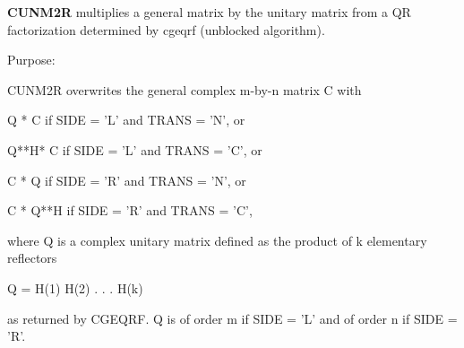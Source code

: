 {\bfseries C\+U\+N\+M2\+R} multiplies a general matrix by the unitary matrix from a Q\+R factorization determined by cgeqrf (unblocked algorithm). 

 \begin{DoxyParagraph}{Purpose\+: }
\begin{DoxyVerb} CUNM2R overwrites the general complex m-by-n matrix C with

       Q * C  if SIDE = 'L' and TRANS = 'N', or

       Q**H* C  if SIDE = 'L' and TRANS = 'C', or

       C * Q  if SIDE = 'R' and TRANS = 'N', or

       C * Q**H if SIDE = 'R' and TRANS = 'C',

 where Q is a complex unitary matrix defined as the product of k
 elementary reflectors

       Q = H(1) H(2) . . . H(k)

 as returned by CGEQRF. Q is of order m if SIDE = 'L' and of order n
 if SIDE = 'R'.\end{DoxyVerb}
 
\end{DoxyParagraph}

